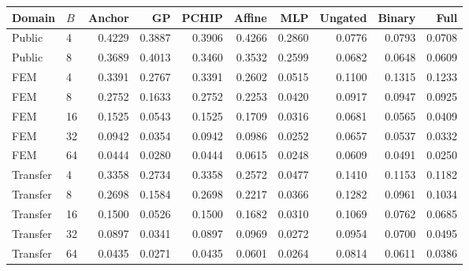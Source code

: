 \begin{tabular}{llrrrrrrrr}
\toprule
Domain & $B$ & Anchor & GP & PCHIP & Affine & MLP & Ungated & Binary & Full \\
\midrule
Public & 4 & 0.4229 & 0.3887 & 0.3906 & 0.4266 & 0.2860 & 0.0776 & 0.0793 & 0.0708 \\
Public & 8 & 0.3689 & 0.4013 & 0.3460 & 0.3532 & 0.2599 & 0.0682 & 0.0648 & 0.0609 \\
FEM & 4 & 0.3391 & 0.2767 & 0.3391 & 0.2602 & 0.0515 & 0.1100 & 0.1315 & 0.1233 \\
FEM & 8 & 0.2752 & 0.1633 & 0.2752 & 0.2253 & 0.0420 & 0.0917 & 0.0947 & 0.0925 \\
FEM & 16 & 0.1525 & 0.0543 & 0.1525 & 0.1709 & 0.0316 & 0.0681 & 0.0565 & 0.0409 \\
FEM & 32 & 0.0942 & 0.0354 & 0.0942 & 0.0986 & 0.0252 & 0.0657 & 0.0537 & 0.0332 \\
FEM & 64 & 0.0444 & 0.0280 & 0.0444 & 0.0615 & 0.0248 & 0.0609 & 0.0491 & 0.0250 \\
Transfer & 4 & 0.3358 & 0.2734 & 0.3358 & 0.2572 & 0.0477 & 0.1410 & 0.1153 & 0.1182 \\
Transfer & 8 & 0.2698 & 0.1584 & 0.2698 & 0.2217 & 0.0366 & 0.1282 & 0.0961 & 0.1034 \\
Transfer & 16 & 0.1500 & 0.0526 & 0.1500 & 0.1682 & 0.0310 & 0.1069 & 0.0762 & 0.0685 \\
Transfer & 32 & 0.0897 & 0.0341 & 0.0897 & 0.0969 & 0.0272 & 0.0954 & 0.0700 & 0.0495 \\
Transfer & 64 & 0.0435 & 0.0271 & 0.0435 & 0.0601 & 0.0264 & 0.0814 & 0.0611 & 0.0386 \\
\bottomrule
\end{tabular}
